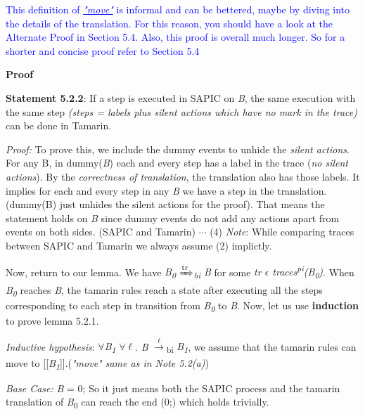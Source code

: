 \documentclass[11pt]{article}
\begin{document}
\textcolor{blue}{This definition of \underline{{\it"move"}} is informal and can be bettered, maybe by diving into the details of the translation. For this reason, you should have a look at the Alternate Proof in Section 5.4. Also, this proof is overall much longer. So for a shorter and concise proof refer to Section 5.4}\newline

{\bf Proof }

{\bf Statement 5.2.2}: If a step is executed in SAPIC on {\it B}, the same execution with the same step {\it(steps = labels plus silent actions which have no mark in the trace)} can be done in Tamarin. \newline

{\it Proof:} To prove this, we include the dummy events to unhide the {\it silent actions}. For any B, in dummy({\it B}) each and every step has a label in the trace ({\it no silent actions}). By the {\it correctness of translation}, the translation also has those labels. It implies for each and every step in any {\it B} we have a step in the translation. (dummy(B) just unhides the silent actions for the proof). That means the statement holds on {\it B} since dummy events do not add any actions apart from events on both sides. (SAPIC and Tamarin) \hfill \hfill $\cdots$ (4) \newline
{\it Note}: While comparing traces between SAPIC and Tamarin we always assume (2) implictly.\newline

Now, return to our lemma. We have {\it B\textsubscript{0} {$\xRightarrow[\text{}]{\text{tr}}$}\textsubscript{bi} B} for some {\it tr $\epsilon$ traces\textsuperscript{pi}(B\textsubscript{0})}. When {\it B\textsubscript{0}} reaches {\it B}, the tamarin rules reach a state after executing all the steps corresponding to each step in transition from {\it B\textsubscript{0}} to {\it B}. Now, let us use {\bf induction} to prove lemma 5.2.1.

{\it Inductive hypothesis}: $\forall${\it B\textsubscript{1}} $\forall$$\ell$. {\it B} {$\xrightarrow[\text{}]{\text{$\ell$}}$}{\textsubscript{bi}} {\it B\textsubscript{1}}, we assume that the tamarin rules can move to [[{\it B\textsubscript{1}}]].\hfill \hfill ({\it "move" same as in Note 5.2(a)}) 

{\it Base Case: }{\it B} = 0; So it just means both the SAPIC process and the tamarin translation of {\it B}\textsubscript{0} can reach the end (0;) which holds trivially.
\end{document}
